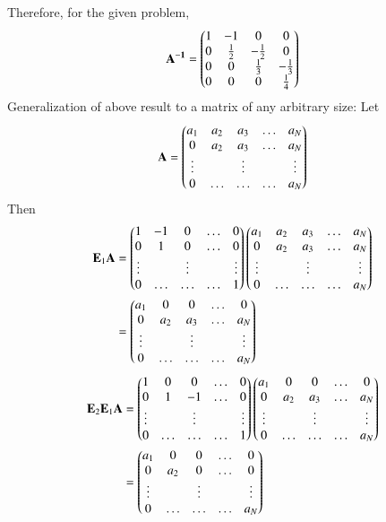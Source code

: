 Therefore, for the given problem,
\begin{align}
        \mathbf{A^{-1}} = \begin{pmatrix} 1 & -1 & 0 & 0 \\
                        0 & \frac{1}{2} & -\frac{1}{2} & 0 \\
                        0 & 0 & \frac{1}{3} & -\frac{1}{3} \\
                        0 & 0 & 0 & \frac{1}{4}\end{pmatrix}
\end{align}
{Generalization of above result to a matrix of any arbitrary size:}
Let
\begin{align}
	\mathbf{A} = \begin{pmatrix} a_1 & a_2 & a_3 & \ldots & a_N \\
			    0 & a_2 & a_3 & \ldots & a_N \\
			  \vdots & & \vdots &  & \vdots  \\
			    0 & \ldots & \ldots & \ldots & a_N \end{pmatrix}
\end{align}
Then
\begin{align}
	\mathbf{E}_1\mathbf{A} &= \begin{pmatrix}1 & -1 & 0 & \ldots & 0 \\
			    0 & 1 & 0 & \ldots & 0 \\
			  \vdots & & \vdots &  & \vdots  \\
			    0 & \ldots & \ldots & \ldots & 1 \end{pmatrix}
	\begin{pmatrix} a_1 & a_2 & a_3 & \ldots & a_N \\
			    0 & a_2 & a_3 & \ldots & a_N \\
			  \vdots & & \vdots &  & \vdots  \\
			    0 & \ldots & \ldots & \ldots & a_N \end{pmatrix} \\
	&=
	\begin{pmatrix} a_1 & 0 & 0 & \ldots & 0 \\
			    0 & a_2 & a_3 & \ldots & a_N \\
			  \vdots & & \vdots &  & \vdots  \\
			    0 & \ldots & \ldots & \ldots & a_N \end{pmatrix}
\end{align}
\begin{align}
	\mathbf{E}_2\mathbf{E}_1\mathbf{A} &= \begin{pmatrix}1 & 0 & 0 & \ldots & 0 \\
			    0 & 1 &-1 & \ldots & 0 \\
			  \vdots & & \vdots &  & \vdots  \\
			    0 & \ldots & \ldots & \ldots & 1 \end{pmatrix}
	\begin{pmatrix} a_1 & 0 & 0 & \ldots & 0 \\
			    0 & a_2 & a_3 & \ldots & a_N \\
			  \vdots & & \vdots &  & \vdots  \\
			    0 & \ldots & \ldots & \ldots & a_N \end{pmatrix} \\
		&=
	\begin{pmatrix} a_1 & 0 & 0 & \ldots & 0 \\
			    0 & a_2 & 0 & \ldots & 0 \\
			  \vdots & & \vdots &  & \vdots  \\
			    0 & \ldots & \ldots & \ldots & a_N \end{pmatrix}
\end{align}

